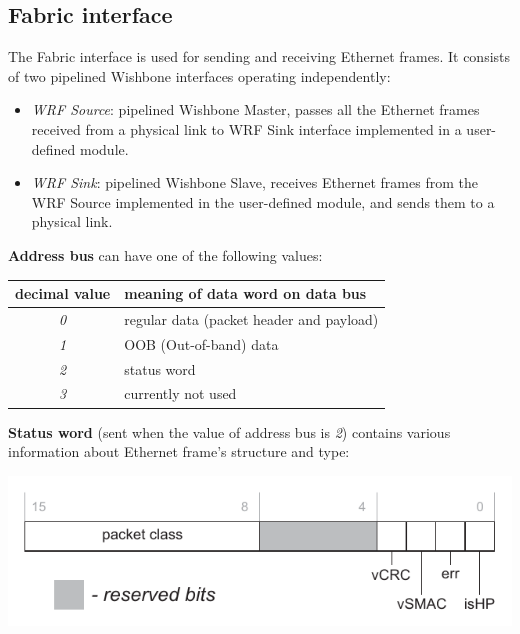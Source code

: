 \subsection{Fabric interface}
\label{sec:wrpc_fabric}


The Fabric interface is used for sending and receiving Ethernet frames. It consists 
of two pipelined Wishbone interfaces operating independently: 

\begin{itemize}
  \item \emph{WRF Source}: pipelined Wishbone Master, passes all the Ethernet frames
    received from a physical link to WRF Sink interface implemented in a
    user-defined module.
  \item \emph{WRF Sink}: pipelined Wishbone Slave, receives Ethernet frames from
    the WRF Source implemented in the user-defined module, and sends them to a
    physical link.
\end{itemize}

{\bf Address bus} can have one of the following values:

\begin{center}
\begin{tabular}{|c|l|}
  \hline {\bf decimal value} & {\bf meaning of data word on data bus}\\
  \hline
  \emph{0} & regular data (packet header and payload)\\
  \emph{1} & OOB (Out-of-band) data\\
  \emph{2} & status word\\
  \emph{3} & currently not used\\
  \hline
\end{tabular}
\end{center}

{\bf Status word} (sent when the value of address bus is \emph{2}) contains
various information about Ethernet frame's structure and type:
  \begin{center}
    \includegraphics[width=.6\textwidth]{fig/status.pdf}
  \end{center}

